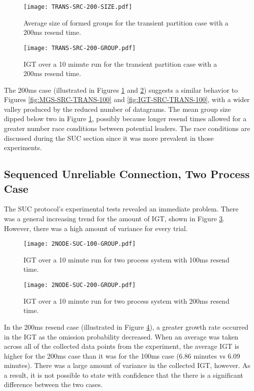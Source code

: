 \begin{figure}
\centering
    \centering
    \texttt{[image: TRANS-SRC-200-SIZE.pdf]}
    \caption{Average size of formed groups for the transient partition case with a 200ms resend time.}
    \label{fig:MGS-SRC-TRANS-200}
\end{figure}
\begin{figure}
    \centering
    \texttt{[image: TRANS-SRC-200-GROUP.pdf]}
    \caption{\ac{IGT} over a 10 minute run for the transient partition case with a 200ms resend time.}
    \label{fig:IGT-SRC-TRANS-200}
\end{figure}

The 200ms case (illustrated in Figures \ref{fig:MGS-SRC-TRANS-200} and \ref{fig:IGT-SRC-TRANS-200}) suggests a similar behavior to Figures \ref{fig:MGS-SRC-TRANS-100} and \ref{fig:IGT-SRC-TRANS-100}, with a wider valley produced by the reduced number of datagrams.
The mean group size dipped below two in Figure \ref{fig:MGS-SRC-TRANS-200}, possibly because longer resend times allowed for a greater number race conditions between potential leaders.
The race conditions are discussed during the SUC section since it was more prevalent in those experiments.

\subsection{Sequenced Unreliable Connection, Two Process Case}

The SUC protocol's experimental tests revealed an immediate problem.
There was a general increasing trend for the amount of \ac{IGT}, shown in Figure \ref{fig:IGT-SUC-2NODE-100}.
However, there was a high amount of variance for every trial.

\begin{figure}
    \centering
    \texttt{[image: 2NODE-SUC-100-GROUP.pdf]}
    \caption{\ac{IGT} over a 10 minute run for two process system with 100ms resend time.}
    \label{fig:IGT-SUC-2NODE-100}
\end{figure}%
\begin{figure}
    \centering
    \texttt{[image: 2NODE-SUC-200-GROUP.pdf]}
    \caption{\ac{IGT} over a 10 minute run for two process system with 200ms resend time.}
    \label{fig:IGT-SUC-2NODE-200}
\end{figure}

In the 200ms resend case (illustrated in Figure \ref{fig:IGT-SUC-2NODE-200}), a greater growth rate occurred in the \ac{IGT} as the omission probability decreased.
When an average was taken across all of the collected data points from the experiment, the average \ac{IGT} is higher for the 200ms case than it was for the 100ms case (6.86 minutes vs 6.09 minutes).
There was a large amount of variance in the collected \ac{IGT}, however.
As a result, it is not possible to state with confidence that the there is a significant difference between the two cases.

